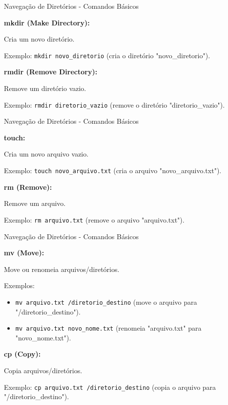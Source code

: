 \documentclass{beamer}
\begin{document}
\begin{frame}{Navegação de Diretórios - Comandos Básicos}

	\textbf{mkdir (Make Directory):}

	Cria um novo diretório.

	Exemplo: \texttt{mkdir novo\_diretorio} (cria o diretório "novo\_diretorio").

	\textbf{rmdir (Remove Directory):}

	Remove um diretório vazio.

	Exemplo: \texttt{rmdir diretorio\_vazio} (remove o diretório "diretorio\_vazio").

	
\end{frame}
\begin{frame}{Navegação de Diretórios - Comandos Básicos}

	
	\textbf{touch:}

	Cria um novo arquivo vazio.

	Exemplo: \texttt{touch novo\_arquivo.txt} (cria o arquivo "novo\_arquivo.txt").

	\textbf{rm (Remove):}

	Remove um arquivo.

	Exemplo: \texttt{rm arquivo.txt} (remove o arquivo "arquivo.txt").

\end{frame}

\begin{frame}{Navegação de Diretórios - Comandos Básicos}

	\textbf{mv (Move):}

	Move ou renomeia arquivos/diretórios.

	Exemplos:
	\begin{itemize}
		\item \texttt{mv arquivo.txt /diretorio\_destino} (move o arquivo para "/diretorio\_destino").
		\item \texttt{mv arquivo.txt novo\_nome.txt} (renomeia "arquivo.txt" para "novo\_nome.txt").
	\end{itemize}

	\textbf{cp (Copy):}

	Copia arquivos/diretórios.

	Exemplo: \texttt{cp arquivo.txt /diretorio\_destino} (copia o arquivo para "/diretorio\_destino").

\end{frame}
\end{document}
